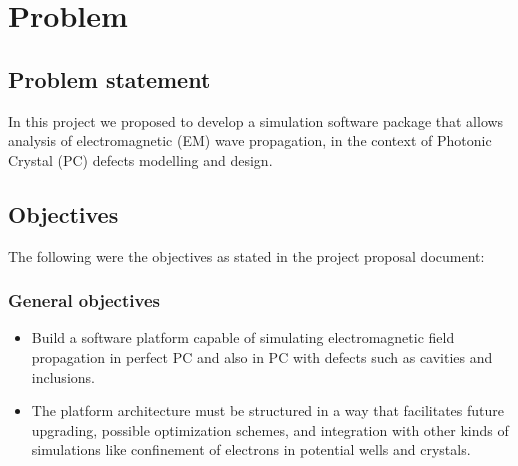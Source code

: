 \chapter{Problem}
\label{ch:Problem}

\section{Problem statement}

In this project we proposed to develop a simulation software package that allows analysis of electromagnetic (EM) wave propagation, in the context of Photonic Crystal (PC) defects modelling and design.

\section{Objectives }
The following were the objectives as stated in the project proposal document:
\subsection{General objectives}
\begin{itemize}
\item Build a software platform capable of simulating   electromagnetic field propagation in perfect PC and also in PC with defects such as cavities and inclusions.
\item The platform architecture must be structured in a way that facilitates future upgrading, possible optimization schemes, and integration with other kinds of simulations like confinement of electrons in potential wells and crystals. 
\end{itemize}



